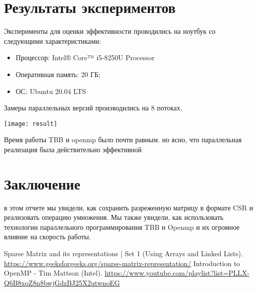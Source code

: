 \documentclass{report}
\begin{document}
\section*{Результаты экспериментов}
\par Эксперименты для оценки эффективности проводились на ноутбук со следующими характеристиками:

\begin{itemize}
\item Процессор: Intel® Core™ i5-8250U Processor
\item Оперативная память: 20 ГБ;
\item ОС: Ubuntu 20.04 LTS
\end{itemize}
\par Замеры параллельных версий производились на 8 потоках.

\texttt{[image: result]}

\par Время работы TBB и openmp было почти равным. но ясно, что параллельная реализация была действительно эффективной

\newpage

\section*{Заключение}
в этом отчете мы увидели, как сохранить разреженную матрицу в формате CSR и реализовать операцию умножения. Мы также увидели, как использовать технологии параллельного программирования TBB и Openmp и их огромное влияние на скорость работы.

\newpage

\begin{thebibliography}{1}
\bibitem Sparse Matrix and its representations | Set 1 (Using Arrays and Linked Lists).
\url{https://www.geeksforgeeks.org/sparse-matrix-representation/}
\bibitem Introduction to OpenMP - Tim Mattson (Intel).
\newline \url{https://www.youtube.com/playlist?list=PLLX-Q6B8xqZ8n8bwjGdzBJ25X2utwnoEG}
\end{thebibliography}
\newpage

\end{document}
